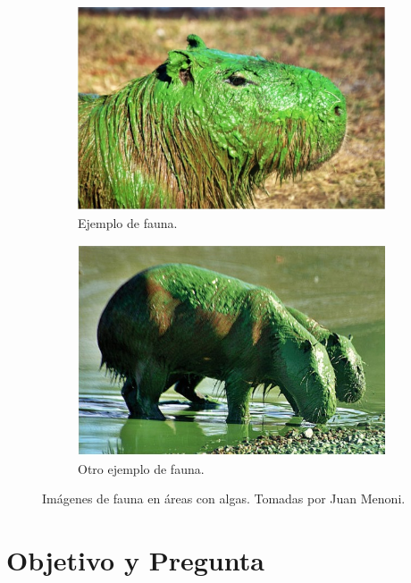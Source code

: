 \documentclass[11pt]{report}
\begin{document}
\begin{figure}[h!]
    \centering
    \begin{subfigure}[b]{0.45\textwidth}
        \centering
        \includegraphics[width=\textwidth]{Imagenes/Fauna_con_Cyano1.jpg}
        \caption{Ejemplo de fauna.}
        \label{fig:fauna1}
    \end{subfigure}
    \hfill
    \begin{subfigure}[b]{0.45\textwidth}
        \centering
        \includegraphics[width=\textwidth]{Imagenes/Fauna_con_Cyano2.jpg}
        \caption{Otro ejemplo de fauna.}
        \label{fig:fauna2}
    \end{subfigure}
    \caption{Imágenes de fauna en áreas con algas. Tomadas por Juan Menoni.}
    \label{fig:fauna}
\end{figure}


\section{Objetivo y Pregunta}
\end{document}
